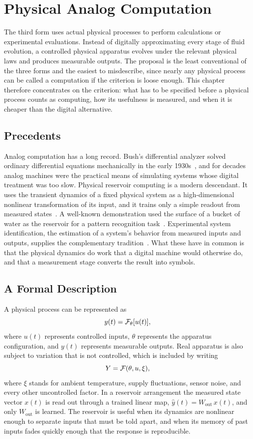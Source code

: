\chapter{Physical Analog Computation}
\label{ch:analog}

The third form uses actual physical processes to perform calculations or experimental evaluations. Instead of digitally approximating every stage of fluid evolution, a controlled physical apparatus evolves under the relevant physical laws and produces measurable outputs. The proposal is the least conventional of the three forms and the easiest to misdescribe, since nearly any physical process can be called a computation if the criterion is loose enough. This chapter therefore concentrates on the criterion: what has to be specified before a physical process counts as computing, how its usefulness is measured, and when it is cheaper than the digital alternative.

\section{Precedents}

Analog computation has a long record. Bush's differential analyzer solved ordinary differential equations mechanically in the early 1930s~\cite{bush1931}, and for decades analog machines were the practical means of simulating systems whose digital treatment was too slow. Physical reservoir computing is a modern descendant. It uses the transient dynamics of a fixed physical system as a high-dimensional nonlinear transformation of its input, and it trains only a simple readout from measured states~\cite{maass2002,tanaka2019}. A well-known demonstration used the surface of a bucket of water as the reservoir for a pattern recognition task~\cite{fernando2003}. Experimental system identification, the estimation of a system's behavior from measured inputs and outputs, supplies the complementary tradition~\cite{ljung1999}. What these have in common is that the physical dynamics do work that a digital machine would otherwise do, and that a measurement stage converts the result into symbols.

\section{A Formal Description}

A physical process can be represented as
\[
y(t)=\mathcal{F}_{\theta}[u(t)],
\]
where $u(t)$ represents controlled inputs, $\theta$ represents the apparatus configuration, and $y(t)$ represents measurable outputs. Real apparatus is also subject to variation that is not controlled, which is included by writing
\[
Y=\mathcal{F}(\theta,u,\xi),
\]
where $\xi$ stands for ambient temperature, supply fluctuations, sensor noise, and every other uncontrolled factor. In a reservoir arrangement the measured state vector $x(t)$ is read out through a trained linear map, $\hat y(t)=W_{\mathrm{out}}\,x(t)$, and only $W_{\mathrm{out}}$ is learned. The reservoir is useful when its dynamics are nonlinear enough to separate inputs that must be told apart, and when its memory of past inputs fades quickly enough that the response is reproducible.

